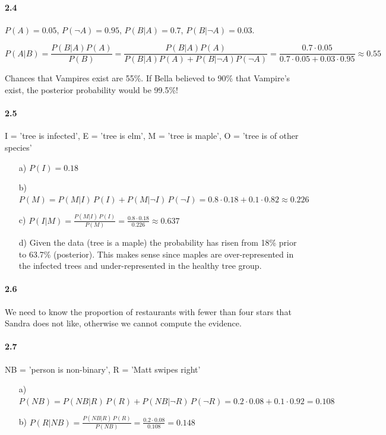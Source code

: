 \documentclass[fontsize=11pt,DIV=18,parskip=half]{scrartcl}
\begin{document}
\paragraph{2.4} $P(A) = 0.05$, $P(\neg A) = 0.95$, $P(B|A) = 0.7$, $P(B|\neg A) = 0.03$.

\begin{equation*}
P(A|B) = \frac{P(B|A) P(A)}{P(B)} = \frac{P(B|A) P(A)}{P(B|A) P(A) + P(B|\neg A) P(\neg A)} = \frac{0.7 \cdot 0.05}{0.7 \cdot 0.05 + 0.03 \cdot 0.95} \approx 0.55
\end{equation*}

Chances that Vampires exist are 55\%. If Bella believed to 90\% that Vampire's exist, the posterior probability would be 99.5\%!

\paragraph{2.5} I = 'tree is infected', E = 'tree is elm', M = 'tree is maple', O = 'tree is of other species'

\begin{enumerate}
\item[a)] $P(I) = 0.18$
\item[b)] $P(M) = P(M|I) \, P(I) + P(M|\neg I) \, P(\neg I) = 0.8 \cdot 0.18 + 0.1 \cdot 0.82 \approx 0.226$
\item[c)] $P(I|M) = \frac{P(M|I) \, P(I)}{P(M)} = \frac{0.8\cdot0.18}{0.226} \approx 0.637$
\item[d)] Given the data (tree is a maple) the probability has risen from 18\% prior to 63.7\% (posterior). This makes sense since maples are over-represented in the infected trees and under-represented in the healthy tree group.
\end{enumerate}

\paragraph{2.6} We need to know the proportion of restaurants with fewer than four stars that Sandra does not like, otherwise we cannot compute the evidence.

\paragraph{2.7} NB = 'person is non-binary', R = 'Matt swipes right'

\begin{enumerate}
\item[a)] $P(NB) = P(NB|R) \, P(R) + P(NB|\neg R) \, P(\neg R) = 0.2 \cdot 0.08 + 0.1 \cdot 0.92 = 0.108$
\item[b)] $P(R|NB) = \frac{P(NB|R) \, P(R)}{P(NB)} = \frac{0.2 \cdot 0.08}{0.108} = 0.148$
\end{enumerate}
\end{document}
